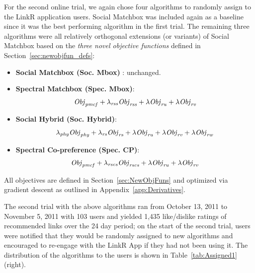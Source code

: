 For the second online trial, we again chose four algorithms to
randomly assign to the LinkR application users.  Social Matchbox
was included again as a baseline since it was the best performing
algorithm in the first trial.  The remaining three algorithms
were all relatively orthogonal extensions (or variants) of Social Matchbox
based on the \emph{three novel objective functions} defined in 
Section~\ref{sec:newobjfun_defs}:
\begin{itemize}
\item {\bf Social Matchbox (Soc. Mbox)} : unchanged.
\item {\bf Spectral Matchbox (Spec. Mbox)}: 
$$\mathit{Obj}_{\mathit{pmcf}} + \lambda_{\mathit{rss}} \mathit{Obj}_{\mathit{rss}} + \lambda \mathit{Obj}_{\mathit{ru}} + \lambda \mathit{Obj}_{\mathit{rv}}$$
\item {\bf Social Hybrid (Soc. Hybrid)}: 
$$\lambda_{\mathit{phy}} \mathit{Obj}_{\mathit{phy}} + \lambda_{\mathit{rs}} \mathit{Obj}_{\mathit{rs}} + \lambda \mathit{Obj}_{\mathit{ru}} + \lambda \mathit{Obj}_{\mathit{rv}} + \lambda \mathit{Obj}_{\mathit{rw}}$$
\item {\bf Spectral Co-preference (Spec. CP)}: 
$$\mathit{Obj}_{\mathit{pmcf}} + \lambda_{\mathit{rscs}} \mathit{Obj}_{\mathit{rscs}} + \lambda \mathit{Obj}_{\mathit{ru}} + \lambda \mathit{Obj}_{\mathit{rv}}$$
\end{itemize}
All objectives are defined in Section~\ref{sec:NewObjFuns} 
and optimized via gradient descent as outlined
in Appendix~\ref{app:Derivatives}.  

The second trial with the above algorithms ran from October 13, 2011
to November 5, 2011 with 103 users and yielded 1,435 like/dislike
ratings of recommended links over the 24 day period; on the start of
the second trial, users were notified that they would be randomly
assigned to new algorithms and encouraged to re-engage with the LinkR
App if they had not been using it.  The distribution of the algorithms
to the users is shown in Table~\ref{tab:Assigned1} (right).

